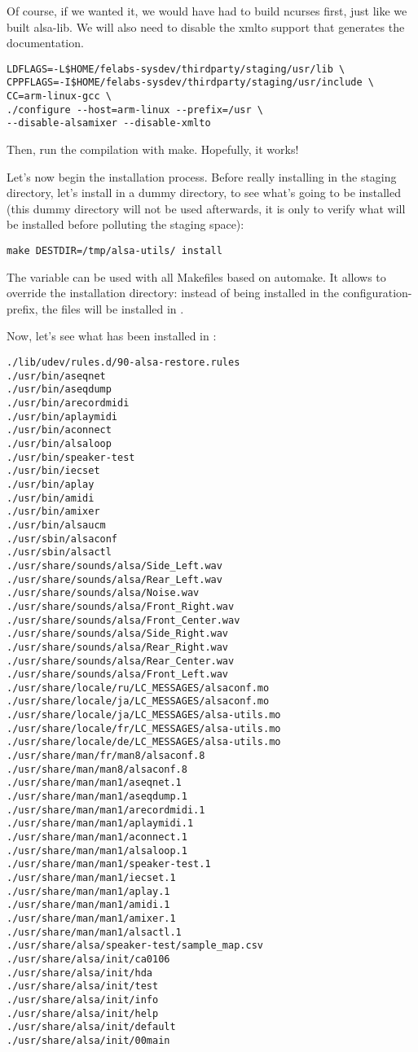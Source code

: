 Of course, if we wanted it, we would have had to build ncurses first,
just like we built alsa-lib. We will also need to disable the xmlto
support that generates the documentation.

\begin{verbatim}
LDFLAGS=-L$HOME/felabs-sysdev/thirdparty/staging/usr/lib \
CPPFLAGS=-I$HOME/felabs-sysdev/thirdparty/staging/usr/include \
CC=arm-linux-gcc \
./configure --host=arm-linux --prefix=/usr \
--disable-alsamixer --disable-xmlto
\end{verbatim}

Then, run the compilation with make. Hopefully, it works!

Let's now begin the installation process.  Before really installing in
the staging directory, let's install in a dummy directory, to see
what's going to be installed (this dummy directory will not be used
afterwards, it is only to verify what will be installed before
polluting the staging space):

\begin{verbatim}
make DESTDIR=/tmp/alsa-utils/ install
\end{verbatim}

The  variable can be used with all Makefiles based on
automake. It allows to override the installation directory: instead of
being installed in the configuration-prefix, the files will be
installed in .

Now, let's see what has been installed in \code{/tmp/alsa-utils/}:

\begin{verbatim}
./lib/udev/rules.d/90-alsa-restore.rules
./usr/bin/aseqnet
./usr/bin/aseqdump
./usr/bin/arecordmidi
./usr/bin/aplaymidi
./usr/bin/aconnect
./usr/bin/alsaloop
./usr/bin/speaker-test
./usr/bin/iecset
./usr/bin/aplay
./usr/bin/amidi
./usr/bin/amixer
./usr/bin/alsaucm
./usr/sbin/alsaconf
./usr/sbin/alsactl
./usr/share/sounds/alsa/Side_Left.wav
./usr/share/sounds/alsa/Rear_Left.wav
./usr/share/sounds/alsa/Noise.wav
./usr/share/sounds/alsa/Front_Right.wav
./usr/share/sounds/alsa/Front_Center.wav
./usr/share/sounds/alsa/Side_Right.wav
./usr/share/sounds/alsa/Rear_Right.wav
./usr/share/sounds/alsa/Rear_Center.wav
./usr/share/sounds/alsa/Front_Left.wav
./usr/share/locale/ru/LC_MESSAGES/alsaconf.mo
./usr/share/locale/ja/LC_MESSAGES/alsaconf.mo
./usr/share/locale/ja/LC_MESSAGES/alsa-utils.mo
./usr/share/locale/fr/LC_MESSAGES/alsa-utils.mo
./usr/share/locale/de/LC_MESSAGES/alsa-utils.mo
./usr/share/man/fr/man8/alsaconf.8
./usr/share/man/man8/alsaconf.8
./usr/share/man/man1/aseqnet.1
./usr/share/man/man1/aseqdump.1
./usr/share/man/man1/arecordmidi.1
./usr/share/man/man1/aplaymidi.1
./usr/share/man/man1/aconnect.1
./usr/share/man/man1/alsaloop.1
./usr/share/man/man1/speaker-test.1
./usr/share/man/man1/iecset.1
./usr/share/man/man1/aplay.1
./usr/share/man/man1/amidi.1
./usr/share/man/man1/amixer.1
./usr/share/man/man1/alsactl.1
./usr/share/alsa/speaker-test/sample_map.csv
./usr/share/alsa/init/ca0106
./usr/share/alsa/init/hda
./usr/share/alsa/init/test
./usr/share/alsa/init/info
./usr/share/alsa/init/help
./usr/share/alsa/init/default
./usr/share/alsa/init/00main
\end{verbatim}

